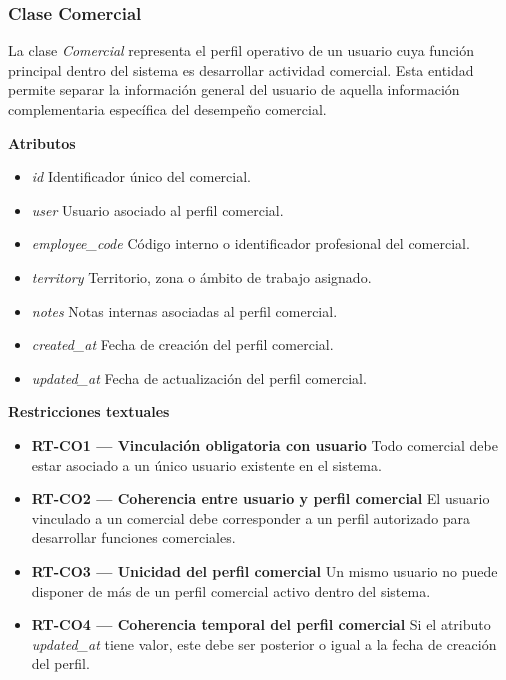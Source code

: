 \subsubsection{Clase Comercial}

La clase \textit{Comercial} representa el perfil operativo de un usuario cuya función principal dentro del sistema es desarrollar actividad comercial. Esta entidad permite separar la información general del usuario de aquella información complementaria específica del desempeño comercial.

\textbf{Atributos}

\begin{itemize}
      \item \textit{id} Identificador único del comercial.
      \item \textit{user} Usuario asociado al perfil comercial.
      \item \textit{employee\_code} Código interno o identificador profesional del comercial.
      \item \textit{territory} Territorio, zona o ámbito de trabajo asignado.
      \item \textit{notes} Notas internas asociadas al perfil comercial.
      \item \textit{created\_at} Fecha de creación del perfil comercial.
      \item \textit{updated\_at} Fecha de actualización del perfil comercial.
\end{itemize}

\textbf{Restricciones textuales}

\begin{itemize}
      \item \textbf{RT-CO1 — Vinculación obligatoria con usuario} Todo comercial debe estar asociado a un único usuario existente en el sistema.
      \item \textbf{RT-CO2 — Coherencia entre usuario y perfil comercial} El usuario vinculado a un comercial debe corresponder a un perfil autorizado para desarrollar funciones comerciales.
      \item \textbf{RT-CO3 — Unicidad del perfil comercial} Un mismo usuario no puede disponer de más de un perfil comercial activo dentro del sistema.
      \item \textbf{RT-CO4 — Coherencia temporal del perfil comercial} Si el atributo \textit{updated\_at} tiene valor, este debe ser posterior o igual a la fecha de creación del perfil.
\end{itemize}

